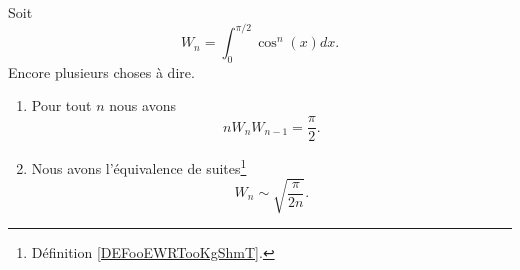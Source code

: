\begin{lemma}       \label{LEMooWQZAooOXAPQO}
	Soit
	\begin{equation}
		W_n=\int_0^{\pi/2}\cos^n(x)dx.
	\end{equation}
	Encore plusieurs choses à dire.
	\begin{enumerate}
		\item
		      Pour tout \( n\) nous avons
		      \begin{equation}        \label{EQooLOLFooMIwMXN}
			      nW_nW_{n-1}=\frac{ \pi }{2}.
		      \end{equation}
		\item
		      Nous avons l'équivalence de suites\footnote{Définition \ref{DEFooEWRTooKgShmT}.}
		      \begin{equation}
			      W_n\sim\sqrt{ \frac{ \pi }{ 2n } }.
		      \end{equation}
	\end{enumerate}
\end{lemma}

